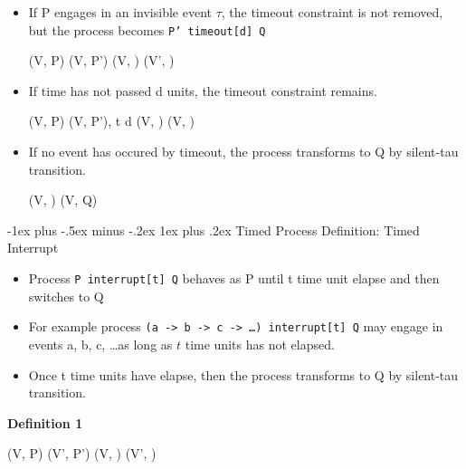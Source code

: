 \documentclass[10pt, landscape]{article}
\makeatletter
\renewcommand{\subsubsection}{\@startsection{subsubsection}{3}{0mm}%
  {-1ex plus -.5ex minus -.2ex}%
  {1ex plus .2ex}%
{\normalfont\small\bfseries}}%
\makeatother
\begin{document}
\begin{multicols*}{3}
\begin{itemize}
\begin{footnotesize}
    \end{footnotesize}
    \item If P engages in an invisible event $\tau$, the timeout constraint is not removed, but the process becomes \texttt{P' timeout[d] Q}
    \begin{footnotesize}
    \begin{axdef}
        (V, P) \xrightarrow{\tau} (V, P')
        \where
        (V, ) \xrightarrow{\tau} (V', )
    \end{axdef}
    \end{footnotesize}
    \item If time has not passed d units, the timeout constraint remains.
    \begin{footnotesize}
        \begin{axdef}
            (V, P)  (V, P'), t \leq d
            \where
            (V, )  (V, )
        \end{axdef}
    \end{footnotesize}
    \item If no event has occured by timeout, the process transforms to Q by silent-tau transition.
    \begin{footnotesize}
        \begin{axdef}
            \where
            (V, ) \xrightarrow{\tau} (V, Q)
        \end{axdef}
    \end{footnotesize}
  \end{itemize}

  \subsubsection{Timed Process Definition: Timed Interrupt}
  \begin{itemize}
      \item Process \texttt{P interrupt[t] Q} behaves as P until t time unit elapse and then switches to Q
      \item For example process \texttt{(a -> b -> c -> \dots) interrupt[t] Q} may engage in events a, b, c, \dots as long as $t$ time units has not elapsed.
      \item Once t time units have elapse, then the process transforms to Q by silent-tau transition.
  \end{itemize}

  \textbf{Definition 1}
  \begin{footnotesize}
      \begin{axdef}
          (V, P)  (V', P')
          \where
          (V, )  (V', )
      \end{axdef}
  \end{footnotesize}


\end{multicols*}
\end{document}
